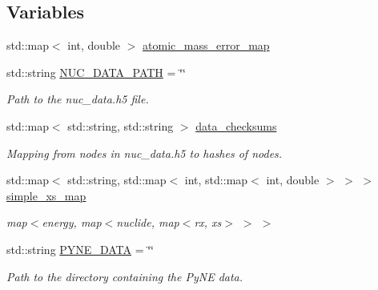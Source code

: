\subsection*{Variables}
\begin{DoxyCompactItemize}
\item 
std\+::map$<$ int, double $>$ \hyperlink{namespacepyne_a70711189f1078e2ebc132db9ce7ab0a7}{atomic\+\_\+mass\+\_\+error\+\_\+map}
\item 
\mbox{\label{namespacepyne_ac4b3b3dcf295d033b906bf921d820ae2}} 
std\+::string \hyperlink{namespacepyne_ac4b3b3dcf295d033b906bf921d820ae2}{N\+U\+C\+\_\+\+D\+A\+T\+A\+\_\+\+P\+A\+TH} = \char`\"{}\char`\"{}
\begin{DoxyCompactList}\small\item\em Path to the nuc\+\_\+data.\+h5 file. \end{DoxyCompactList}\item 
std\+::map$<$ std\+::string, std\+::string $>$ \hyperlink{namespacepyne_a092bde815498a51a7532e3021a63ede5}{data\+\_\+checksums}
\begin{DoxyCompactList}\small\item\em Mapping from nodes in nuc\+\_\+data.\+h5 to hashes of nodes. \end{DoxyCompactList}\item 
\mbox{\label{namespacepyne_a75b3d385906d5d2f078a6d099629a5c8}} 
std\+::map$<$ std\+::string, std\+::map$<$ int, std\+::map$<$ int, double $>$ $>$ $>$ \hyperlink{namespacepyne_a75b3d385906d5d2f078a6d099629a5c8}{simple\+\_\+xs\+\_\+map}
\begin{DoxyCompactList}\small\item\em map$<$energy, map$<$nuclide, map$<$rx, xs$>$ $>$ $>$ \end{DoxyCompactList}\item 
\mbox{\label{namespacepyne_a7927bda45ba222dccef6e43a373b76a6}} 
std\+::string \hyperlink{namespacepyne_a7927bda45ba222dccef6e43a373b76a6}{P\+Y\+N\+E\+\_\+\+D\+A\+TA} = \char`\"{}\char`\"{}
\begin{DoxyCompactList}\small\item\em Path to the directory containing the Py\+NE data. \end{DoxyCompactList}\item 
\mbox{\label{namespacepyne_a462bdf434637e275c203175076b85c36}} 

\end{DoxyCompactItemize}
